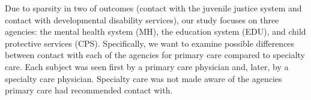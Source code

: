 \documentclass{article}
\begin{document}
\begin{enumerate}
	Due to sparsity in two of outcomes (contact with the juvenile justice system and contact with developmental disability services), our study focuses on three agencies: the mental health system (MH), the education system (EDU), and child protective services (CPS). Specifically, we want to examine possible differences between contact with each of the agencies for primary care compared to specialty care. Each subject was seen first by a primary care physician and, later, by a specialty care physician. Specialty care was not made aware of the agencies primary care had recommended contact with. 
	
		
	
	\end{enumerate}
		
\end{document}
